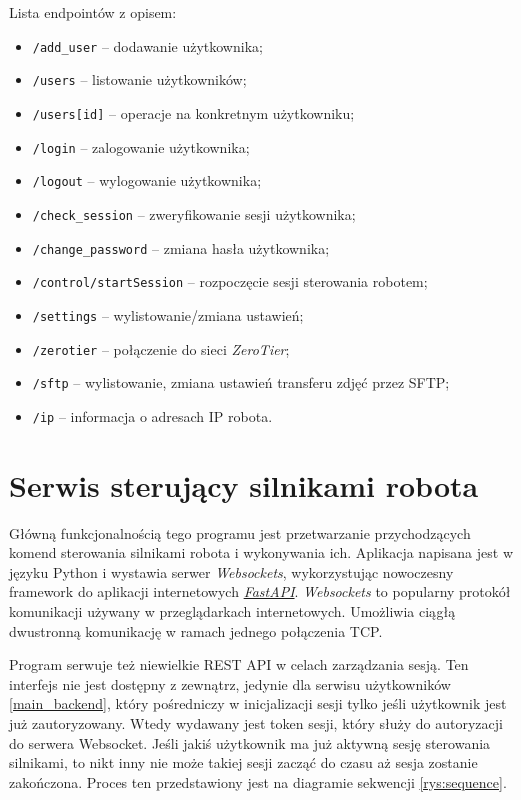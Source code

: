 Lista endpointów z opisem:
\begin{itemize}
    \item \texttt{/add\_user} -- dodawanie użytkownika;
    \item \texttt{/users} -- listowanie użytkowników;
    \item \texttt{/users\/[id]} -- operacje na konkretnym użytkowniku;
    \item \texttt{/login} -- zalogowanie użytkownika;
    \item \texttt{/logout} -- wylogowanie użytkownika;
    \item \texttt{/check\_session} -- zweryfikowanie sesji użytkownika;
    \item \texttt{/change\_password} -- zmiana hasła użytkownika;
    \item \texttt{/control/startSession} -- rozpoczęcie sesji sterowania robotem;
    \item \texttt{/settings} -- wylistowanie/zmiana ustawień;
    \item \texttt{/zerotier} -- połączenie do sieci \textit{ZeroTier};
    \item \texttt{/sftp} -- wylistowanie, zmiana ustawień transferu zdjęć przez SFTP;
    \item \texttt{/ip} -- informacja o adresach IP robota.
\end{itemize}

\section{Serwis sterujący silnikami robota}
\label{engine_service}
Główną funkcjonalnością tego programu jest przetwarzanie przychodzących komend sterowania silnikami robota i wykonywania ich.
Aplikacja napisana jest w języku Python i wystawia serwer \textit{Websockets}, wykorzystując nowoczesny framework do aplikacji internetowych \href{https://fastapi.tiangolo.com/}{\textit{FastAPI}}.
\textit{Websockets} to popularny protokół komunikacji używany w przeglądarkach internetowych.
Umożliwia ciągłą dwustronną komunikację w ramach jednego połączenia TCP.

Program serwuje też niewielkie REST API w celach zarządzania sesją.
Ten interfejs nie jest dostępny z zewnątrz, jedynie dla serwisu użytkowników \ref{main_backend}, który pośredniczy w inicjalizacji sesji tylko jeśli użytkownik jest już zautoryzowany.
Wtedy wydawany jest token sesji, który służy do autoryzacji do serwera Websocket.
Jeśli jakiś użytkownik ma już aktywną sesję sterowania silnikami, to nikt inny nie może takiej sesji zacząć do czasu aż sesja zostanie zakończona.
Proces ten przedstawiony jest na diagramie sekwencji \ref{rys:sequence}.

